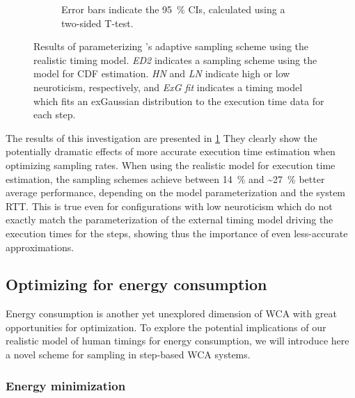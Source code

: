\begin{figure}
\begin{subfigure}[]{\textwidth}
{            Error bars indicate the \SI{95}{\percent} \acp{CI}, calculated using a two-sided T-test.
        }
    \end{subfigure}
    \caption{%
        Results of parameterizing \textcite{Wang2019Towards}'s adaptive sampling scheme using the realistic timing model.
        \emph{ED2} indicates a sampling scheme using the \edgedroid{} model for \ac{CDF} estimation.
        \emph{HN} and \emph{LN} indicate high or low neuroticism, respectively, and \emph{ExG fit} indicates a timing model which fits an \ac{exGaussian} distribution to the execution time data for each step.
    }\label{fig:samples}
\end{figure}

The results of this investigation are presented in \cref{fig:samples}
They clearly show the potentially dramatic effects of more accurate execution time estimation when optimizing sampling rates.
When using the realistic model for execution time estimation, the sampling schemes achieve between \SI{14}{\percent} and \textasciitilde\SI{27}{\percent} better average performance, depending on the \edgedroid{} model parameterization and the system \ac{RTT}.
This is true even for configurations with low neuroticism which do not exactly match the parameterization of the external timing model driving the execution times for the steps, showing thus the importance of even less-accurate approximations.

\subsection{Optimizing for energy consumption}

Energy consumption is another yet unexplored dimension of \ac{WCA} with great opportunities for optimization.
To explore the potential implications of our realistic model of human timings for energy consumption, we will introduce here a novel scheme for sampling in step-based \ac{WCA} systems.

\subsubsection{Energy minimization}\label{sec:aprxSol_Energy}


